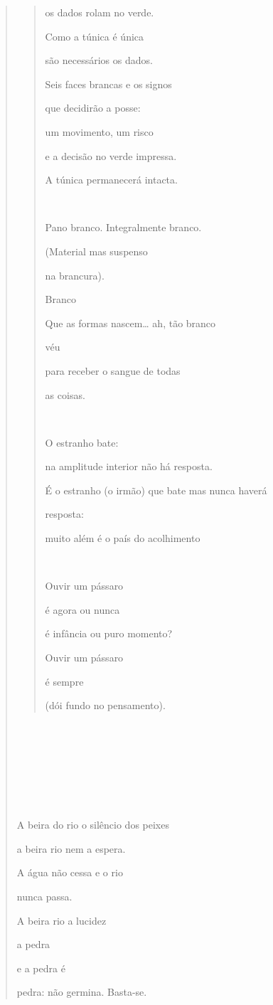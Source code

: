 \begin{verse}
\begin{quote}
os dados rolam no verde.

Como a túnica é única

são necessários os dados.

Seis faces brancas e os signos

que decidirão a posse:

um movimento, um risco

e a decisão no verde impressa.

A túnica permanecerá intacta.



Pano branco. Integralmente branco.

(Material mas suspenso

na brancura).

Branco

Que as formas nascem\ldots{} ah, tão branco

véu

para receber o sangue de todas

as coisas.



O estranho bate:

na amplitude interior não há resposta.

É o estranho (o irmão) que bate mas nunca haverá

resposta:

muito além é o país do acolhimento



Ouvir um pássaro

é agora ou nunca

é infância ou puro momento?

Ouvir um pássaro

é sempre

(dói fundo no pensamento).
\end{quote}









A beira do rio o silêncio dos peixes

a beira rio nem a espera.

A água não cessa e o rio

nunca passa.

A beira rio a lucidez

a pedra

e a pedra é

pedra: não germina. Basta-se.


\end{verse}
